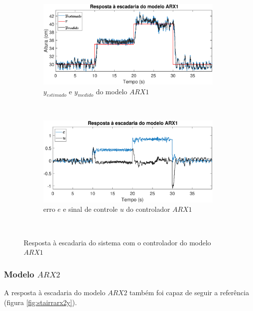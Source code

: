\begin{figure}[htb]
	\centering
	\begin{subfigure}[t]{0.48\textwidth}
		\includegraphics[width=1\linewidth]{stairrarx1y}
		\caption[$y_{estimado}$ e $y_{medido}$ do modelo $ARX1$]{$y_{estimado}$ e $y_{medido}$ do modelo $ARX1$}
		\label{fig:stairrarx1y}
	\end{subfigure}
	~ %
	\begin{subfigure}[t]{0.48\textwidth}
		\includegraphics[width=1\linewidth]{stairrarx1e}
		\caption[erro $e$ e sinal de controle $u$ do controlador $ARX1$]{erro $e$ e sinal de controle $u$ do controlador $ARX1$}
		\label{fig:stairrarx1e}
	\end{subfigure}
	~ %
	
	\caption{Resposta à escadaria do sistema com o controlador do modelo $ARX1$}\label{fig:stairrarx1}
\end{figure}

\subsubsection{Modelo $ARX2$}
A resposta à escadaria do modelo $ARX2$ também foi capaz de seguir a referência (figura \ref{fig:stairrarx2y}).

